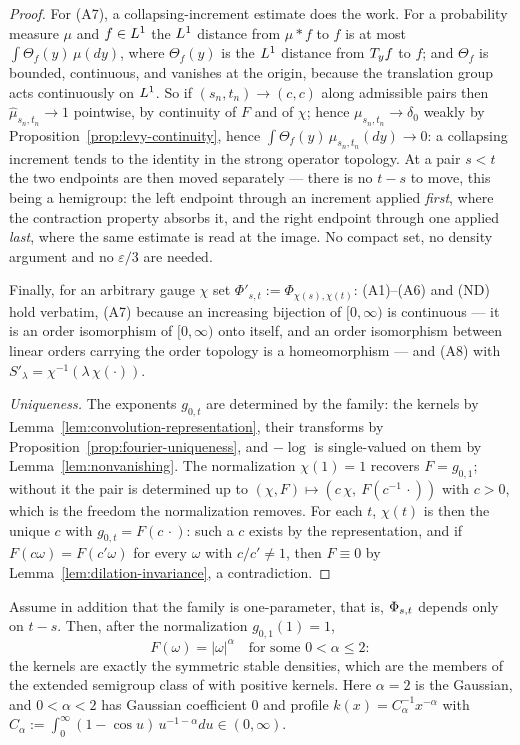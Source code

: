 \begin{proof}
For (A7), a collapsing-increment estimate does the work. For a probability measure $\mu$ and
$f \in L^1$ the $L^1$ distance from $\mu * f$ to $f$ is at most $\int \Theta_f(y)\,\mu(dy)$,
where $\Theta_f(y)$ is the $L^1$ distance from $T_{y}f$ to $f$; and $\Theta_f$ is bounded,
continuous, and vanishes at the origin, because the translation group acts continuously on
$L^1$. So if $(s_n,t_n) \to (c,c)$ along admissible pairs then $\hat\mu_{s_n,t_n} \to 1$
pointwise, by continuity of $F$ and of $\chi$; hence $\mu_{s_n,t_n} \to \delta_0$ weakly by
Proposition~\ref{prop:levy-continuity}, hence
$\int \Theta_f(y)\,\mu_{s_n,t_n}(dy) \to 0$: a collapsing increment tends to the identity in
the strong operator topology. At a pair $s < t$ the two endpoints are then moved separately
--- there is no $t - s$ to move, this being a hemigroup: the left endpoint through an
increment applied \emph{first}, where the contraction property absorbs it, and the right
endpoint through one applied \emph{last}, where the same estimate is read at the image. No
compact set, no density argument and no $\varepsilon/3$ are needed.

Finally, for an arbitrary gauge $\chi$ set $\Phi'_{s,t} := \Phi_{\chi(s),\chi(t)}$: (A1)--(A6)
and (ND) hold verbatim, (A7) because an increasing bijection of $[0,\infty)$ is continuous ---
it is an order isomorphism of $[0,\infty)$ onto itself, and an order isomorphism between linear
orders carrying the order topology is a homeomorphism --- and (A8) with
$S'_\lambda = \chi^{-1}(\lambda\,\chi(\cdot))$.

\emph{Uniqueness.} The exponents $g_{0,t}$ are determined by the family: the kernels by
Lemma~\ref{lem:convolution-representation}, their transforms by
Proposition~\ref{prop:fourier-uniqueness}, and $-\log$ is single-valued on them by
Lemma~\ref{lem:nonvanishing}. The normalization $\chi(1) = 1$ recovers $F = g_{0,1}$; without
it the pair is determined up to $(\chi,F) \mapsto (c\,\chi,\ F(c^{-1}\,\cdot))$ with $c > 0$,
which is the freedom the normalization removes. For each $t$, $\chi(t)$ is then the unique
$c$ with $g_{0,t} = F(c\,\cdot)$: such a $c$ exists by the representation, and if
$F(c\omega) = F(c'\omega)$ for every $\omega$ with $c/c' \ne 1$, then $F \equiv 0$ by
Lemma~\ref{lem:dilation-invariance}, a contradiction.
\end{proof}

\begin{corollary}\label{cor:semigroup-case}
Assume in addition that the family is one-parameter, that is, $\Phi_{s,t}$ depends only on
$t - s$. Then, after the normalization $g_{0,1}(1) = 1$,
\[
  F(\omega) = |\omega|^\alpha \quad \text{for some } 0 < \alpha \le 2 :
\]
the kernels are exactly the symmetric stable densities, which are the members of the extended
semigroup class of  with positive kernels. Here $\alpha = 2$ is the
Gaussian, and $0 < \alpha < 2$ has Gaussian coefficient $0$ and profile
$k(x) = C_\alpha^{-1}x^{-\alpha}$ with
$C_\alpha := \int_0^\infty (1 - \cos u)\,u^{-1-\alpha}du \in (0,\infty)$.
\end{corollary}

